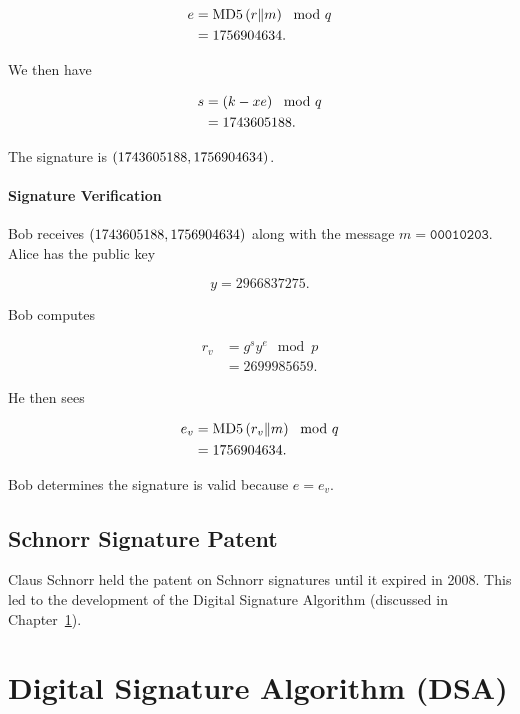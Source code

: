 \begin{example}
\begin{align}
    e &= \text{MD5{}}\left( r\|m \right) \mod q \nonumber\\
        &= 1756904634.
\end{align}

\noindent
We then have

\begin{align}
    s &= \left( k - xe \right) \mod q \nonumber\\
        &= 1743605188.
\end{align}

\noindent
The signature is $\left( 1743605188, 1756904634 \right)$.

\paragraph{Signature Verification}
Bob receives $\left( 1743605188, 1756904634 \right)$
along with the message $m = \texttt{00010203}$.
Alice has the public key

\begin{equation}
    y = 2966837275.
\end{equation}

\noindent
Bob computes

\begin{align}
    r_{v} &= g^{s}y^{e} \mod p \nonumber\\
        &= 2699985659.
\end{align}

\noindent
He then sees

\begin{align}
    e_{v} &= \text{MD5{}}\left( r_{v}\|m \right) \mod q \nonumber\\
        &= 1756904634.
\end{align}

\noindent
Bob determines the signature is valid because $e = e_{v}$.
\end{example}

\subsection{Schnorr Signature Patent}

Claus Schnorr held the patent on Schnorr signatures until it expired in 2008.
This led to the development of the Digital Signature Algorithm
(discussed in Chapter~\ref{sec:signatures_dsa}).



\section{Digital Signature Algorithm (DSA)}
\label{sec:signatures_dsa}

